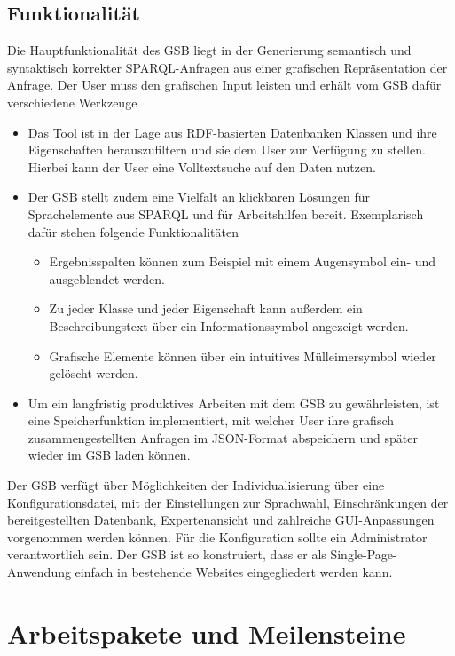 \subsection*{Funktionalität}
Die Hauptfunktionalität des GSB liegt in der Generierung semantisch
und syntaktisch korrekter SPARQL-Anfragen aus einer grafischen
Repräsentation der Anfrage. Der User muss den grafischen Input leisten
und erhält vom GSB dafür verschiedene Werkzeuge
\begin{itemize}
\item Das Tool ist in der Lage aus RDF-basierten Datenbanken Klassen
  und ihre Eigenschaften herauszufiltern und sie dem User zur
  Verfügung zu stellen. Hierbei kann der User eine Volltextsuche auf
  den Daten nutzen. 
\item Der GSB stellt zudem eine Vielfalt an klickbaren Lösungen für
  Sprachelemente aus SPARQL und für Arbeitshilfen bereit. Exemplarisch
  dafür stehen folgende Funktionalitäten
  \begin{itemize}
  \item Ergebnisspalten können zum Beispiel mit einem Augensymbol ein-
    und ausgeblendet werden.
  \item Zu jeder Klasse und jeder Eigenschaft kann außerdem ein
    Beschreibungstext über ein Informationssymbol angezeigt werden.
  \item Grafische Elemente können über ein intuitives Mülleimersymbol
    wieder gelöscht werden.
  \end{itemize}
\item 
Um ein langfristig produktives Arbeiten mit dem GSB zu gewährleisten,
ist eine Speicherfunktion implementiert, mit welcher User ihre
grafisch zusammengestellten Anfragen im JSON-Format abspeichern und
später wieder im GSB laden können.
\end{itemize}
Der GSB verfügt über Möglichkeiten der Individualisierung über eine Konfigurationsdatei, mit der Einstellungen zur Sprachwahl, Einschränkungen der bereitgestellten Datenbank, Expertenansicht und zahlreiche GUI-Anpassungen vorgenommen werden können. Für die Konfiguration sollte ein Administrator verantwortlich sein.
Der GSB ist so konstruiert, dass er als Single-Page-Anwendung einfach
in bestehende Websites eingegliedert werden kann.


\section{Arbeitspakete und Meilensteine}

